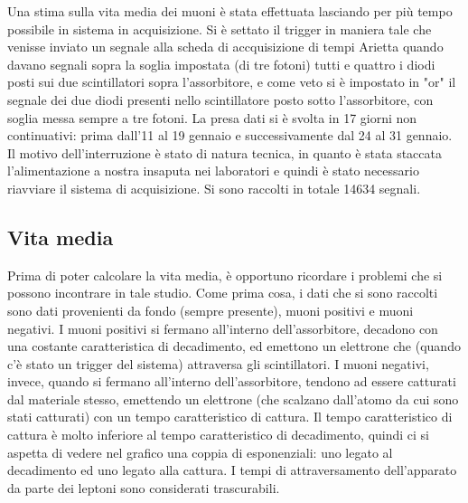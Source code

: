 Una stima sulla vita media dei muoni è stata effettuata lasciando per più tempo possibile in sistema in acquisizione. Si è settato il trigger in maniera tale che venisse inviato un segnale alla scheda di accquisizione di tempi Arietta quando davano segnali sopra la soglia  impostata (di tre fotoni) tutti e quattro i diodi posti sui due scintillatori sopra l'assorbitore, e come veto si è impostato in "or" il segnale dei due diodi presenti nello scintillatore posto sotto l'assorbitore, con soglia messa sempre a tre fotoni. La presa dati si è svolta in 17 giorni non continuativi: prima dall'11 al 19 gennaio e successivamente dal 24 al 31 gennaio. Il motivo dell'interruzione è stato di natura tecnica, in quanto è stata staccata l'alimentazione a nostra insaputa nei laboratori e quindi è stato necessario riavviare il sistema di acquisizione. Si sono raccolti in totale 14634 segnali.

\subsection{Vita media}
Prima di poter calcolare la vita  media, è opportuno ricordare i problemi che si possono incontrare in tale studio. Come prima cosa, i dati che si sono raccolti sono dati provenienti da fondo (sempre presente),  muoni positivi e muoni negativi. I muoni positivi si fermano all'interno dell'assorbitore, decadono con una costante caratteristica di decadimento, ed emettono un elettrone che (quando c'è stato un  trigger del sistema) attraversa gli scintillatori. I muoni negativi, invece, quando si fermano all'interno dell'assorbitore, tendono ad essere catturati dal materiale stesso, emettendo un elettrone (che scalzano dall'atomo da cui sono stati catturati) con un tempo caratteristico di cattura. Il tempo caratteristico di cattura è molto inferiore al tempo caratteristico di decadimento, quindi ci si aspetta di vedere nel grafico una coppia di esponenziali: uno legato al decadimento ed uno legato alla cattura. I tempi di attraversamento dell'apparato da parte dei leptoni sono considerati trascurabili.\\

